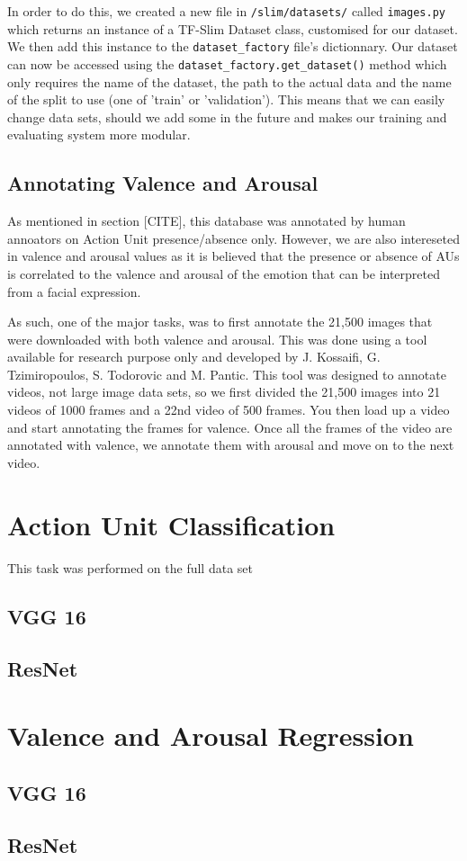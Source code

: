 \documentclass[12pt,twoside]{article}
\begin{document}
In order to do this, we created a new file in \texttt{/slim/datasets/} called \texttt{images.py} 
which returns an instance of a TF-Slim Dataset class, customised for our dataset. 
We then add this instance to the \texttt{dataset\_factory} file's dictionnary.
Our dataset can now be accessed using the
\texttt{dataset\_factory.get\_dataset()} method which only requires the name of
the dataset, the path to the actual data and the name of the split to use (one
of 'train' or 'validation'). This means that we can easily change data sets,
should we add some in the future and makes our training and evaluating system
more modular.

\subsection{Annotating Valence and Arousal}

As mentioned in section [CITE], this database was annotated by human annoators
on Action Unit presence/absence only. However, we are also intereseted in
valence and arousal values as it is believed that the presence or absence of
AUs is correlated to the valence and arousal of the emotion that can be
interpreted from a facial expression.

As such, one of the major tasks, was to first annotate the 21,500 images that
were downloaded with both valence and arousal. This was done using a tool
available for research purpose only and developed by J. Kossaifi, 
G. Tzimiropoulos, S. Todorovic and M. Pantic. This tool was designed to
annotate videos, not large image data sets, so we first divided the 21,500
images into 21 videos of 1000 frames and a 22nd video of 500 frames. You then
load up a video and start annotating the frames for valence. Once all the
frames of the video are annotated with valence, we annotate them with arousal
and move on to the next video.

\section{Action Unit Classification}

This task was performed on the full data set

\subsection{VGG 16}

\subsection{ResNet}

\section{Valence and Arousal Regression}

\subsection{VGG 16}

\subsection{ResNet}








\clearpage



\appendix
\end{document}
